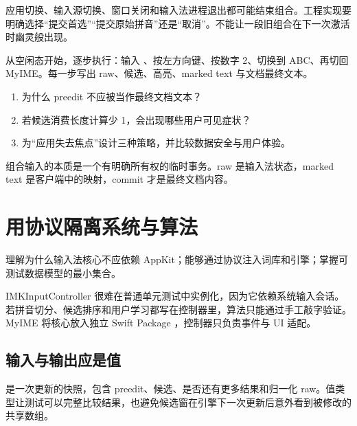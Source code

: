\begin{warningbox}[会话结束]
应用切换、输入源切换、窗口关闭和输入法进程退出都可能结束组合。工程实现要明确选择“提交首选”“提交原始拼音”还是“取消”。不能让一段旧组合在下一次激活时幽灵般出现。
\end{warningbox}

\begin{lab}[纸上状态机]
从空闲态开始，逐步执行：输入 、按左方向键、按数字 2、切换到 ABC、再切回 MyIME。每一步写出 raw、候选、高亮、marked text 与文档最终文本。
\end{lab}

\exercises
\begin{enumerate}
  \item 为什么 preedit 不应被当作最终文档文本？
  \item 若候选消费长度计算少 1，会出现哪些用户可见症状？
  \item 为“应用失去焦点”设计三种策略，并比较数据安全与用户体验。
\end{enumerate}

\begin{summarybox}
组合输入的本质是一个有明确所有权的临时事务。raw 是输入法状态，marked text 是客户端中的映射，commit 才是最终文档内容。
\end{summarybox}


\chapter{用协议隔离系统与算法}

\begin{goals}
理解为什么输入法核心不应依赖 AppKit；能够通过协议注入词库和引擎；掌握可测试数据模型的最小集合。
\end{goals}

IMKInputController 很难在普通单元测试中实例化，因为它依赖系统输入会话。若拼音切分、候选排序和用户学习都写在控制器里，算法只能通过手工敲字验证。MyIME 将核心放入独立 Swift Package ，控制器只负责事件与 UI 适配。



\section{输入与输出应是值}

 是一次更新的快照，包含 preedit、候选、是否还有更多结果和归一化 raw。值类型让测试可以完整比较结果，也避免候选窗在引擎下一次更新后意外看到被修改的共享数组。

